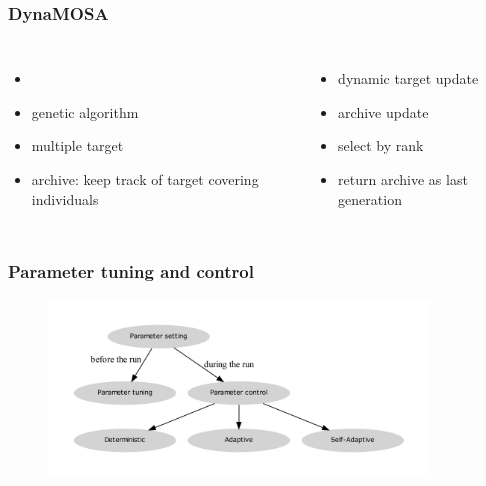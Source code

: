 \begin{frame}
	\frametitle{DynaMOSA}
	
	\begin{columns}[c]
		
		
		\begin{itemize}
			\item \cite{Panichella.2017}
			\item genetic algorithm
			\item multiple target
			\item archive: keep track of target covering individuals
		\end{itemize}
		
		
		\begin{itemize}
			\item dynamic target update
			\item archive update
			\item select by rank
			\item return archive as last generation
		\end{itemize}	
		
	\end{columns}
	
\end{frame}

\begin{frame}
	\frametitle{Parameter tuning and control}
	
	\begin{figure}
		\includegraphics[width=0.9\textwidth]{figures/flowchart_parameter_control}
	\end{figure}
	\cite{Eiben.1999}
	
\end{frame}